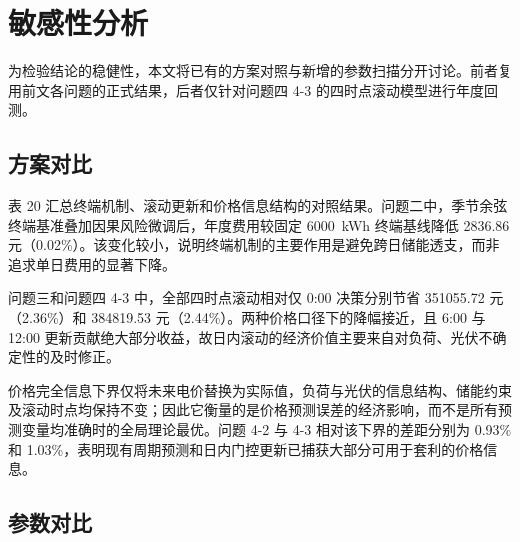 \section{敏感性分析}

为检验结论的稳健性，本文将已有的方案对照与新增的参数扫描分开讨论。前者复用前文各问题的正式结果，后者仅针对问题四 4-3 的四时点滚动模型进行年度回测。

\subsection{方案对比}

表 20 汇总终端机制、滚动更新和价格信息结构的对照结果。问题二中，季节余弦终端基准叠加因果风险微调后，年度费用较固定 6000~kWh 终端基线降低 2836.86 元（0.02\%）。该变化较小，说明终端机制的主要作用是避免跨日储能透支，而非追求单日费用的显著下降。

问题三和问题四 4-3 中，全部四时点滚动相对仅 0:00 决策分别节省 351055.72 元（2.36\%）和 384819.53 元（2.44\%）。两种价格口径下的降幅接近，且 6:00 与 12:00 更新贡献绝大部分收益，故日内滚动的经济价值主要来自对负荷、光伏不确定性的及时修正。

价格完全信息下界仅将未来电价替换为实际值，负荷与光伏的信息结构、储能约束及滚动时点均保持不变；因此它衡量的是价格预测误差的经济影响，而不是所有预测变量均准确时的全局理论最优。问题 4-2 与 4-3 相对该下界的差距分别为 0.93\% 和 1.03\%，表明现有周期预测和日内门控更新已捕获大部分可用于套利的价格信息。

{\footnotesize
{}
}

\subsection{参数对比}

